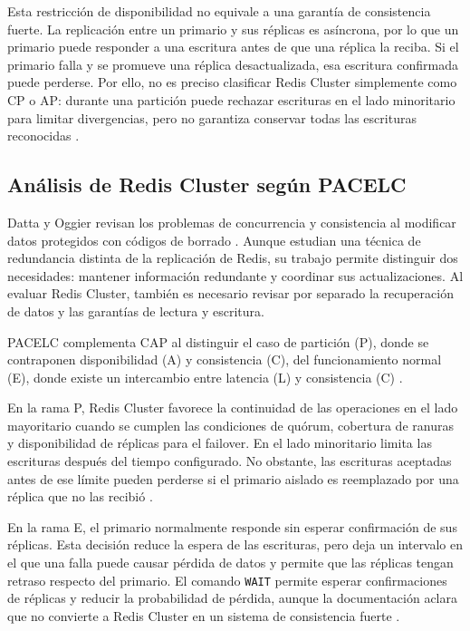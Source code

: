 \documentclass[12pt,a4paper]{article}
\begin{document}
Esta restricción de disponibilidad no equivale a una garantía de consistencia fuerte. La replicación entre un primario y sus réplicas es asíncrona, por lo que un primario puede responder a una escritura antes de que una réplica la reciba. Si el primario falla y se promueve una réplica desactualizada, esa escritura confirmada puede perderse. Por ello, no es preciso clasificar Redis Cluster simplemente como CP o AP: durante una partición puede rechazar escrituras en el lado minoritario para limitar divergencias, pero no garantiza conservar todas las escrituras reconocidas \cite{redisClusterSpec,redisReplication}.

\subsection{Análisis de Redis Cluster según PACELC}

Datta y Oggier revisan los problemas de concurrencia y consistencia al modificar datos protegidos con códigos de borrado \cite{datta2022consistency}. Aunque estudian una técnica de redundancia distinta de la replicación de Redis, su trabajo permite distinguir dos necesidades: mantener información redundante y coordinar sus actualizaciones. Al evaluar Redis Cluster, también es necesario revisar por separado la recuperación de datos y las garantías de lectura y escritura.

PACELC complementa CAP al distinguir el caso de partición (P), donde se contraponen disponibilidad (A) y consistencia (C), del funcionamiento normal (E), donde existe un intercambio entre latencia (L) y consistencia (C) \cite{abadi2012consistency}.

En la rama P, Redis Cluster favorece la continuidad de las operaciones en el lado mayoritario cuando se cumplen las condiciones de quórum, cobertura de ranuras y disponibilidad de réplicas para el failover. En el lado minoritario limita las escrituras después del tiempo configurado. No obstante, las escrituras aceptadas antes de ese límite pueden perderse si el primario aislado es reemplazado por una réplica que no las recibió \cite{redisClusterSpec,redisClusterScaling}.

En la rama E, el primario normalmente responde sin esperar confirmación de sus réplicas. Esta decisión reduce la espera de las escrituras, pero deja un intervalo en el que una falla puede causar pérdida de datos y permite que las réplicas tengan retraso respecto del primario. El comando \texttt{WAIT} permite esperar confirmaciones de réplicas y reducir la probabilidad de pérdida, aunque la documentación aclara que no convierte a Redis Cluster en un sistema de consistencia fuerte \cite{redisClusterSpec,redisClusterScaling}.
\end{document}
